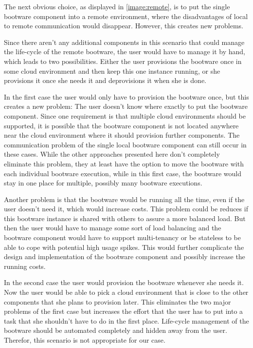The next obvious choice, as displayed in \autoref{image:remote}, is to put the single bootware component into a remote environment, where the disadvantages of local to remote communication would disappear.
However, this creates new problems.

Since there aren't any additional components in this scenario that could manage the life-cycle of the remote bootware, the user would have to manage it by hand, which leads to two possibilities.
Either the user provisions the bootware once in some cloud environment and then keep this one instance running, or she provisions it once she needs it and deprovisions it when she is done.

In the first case the user would only have to provision the bootware once, but this creates a new problem: The user doesn't know where exactly to put the bootware component.
Since one requirement is that multiple cloud environments should be supported, it is possible that the bootware component is not located anywhere near the cloud environment where it should provision further components.
The communication problem of the single local bootware component can still occur in these cases.
While the other approaches presented here don't completely eliminate this problem, they at least have the option to move the bootware with each individual bootware execution, while in this first case, the bootware would stay in one place for multiple, possibly many bootware executions.

Another problem is that the bootware would be running all the time, even if the user doesn't need it, which would increase costs.
This problem could be reduces if this bootware instance is shared with others to assure a more balanced load.
But then the user would have to manage some sort of load balancing and the bootware component would have to support multi-tenancy or be stateless to be able to cope with potential high usage spikes.
This would further complicate the design and implementation of the bootware component and possibly increase the running costs.

In the second case the user would provision the bootware whenever she needs it. Now the user would be able to pick a cloud environment that is close to the other components that she plans to provision later.
This eliminates the two major problems of the first case but increases the effort that the user has to put into a task that she shouldn't have to do in the first place.
Life-cycle management of the bootware should be automated completely and hidden away from the user.
Therefor, this scenario is not appropriate for our case.

